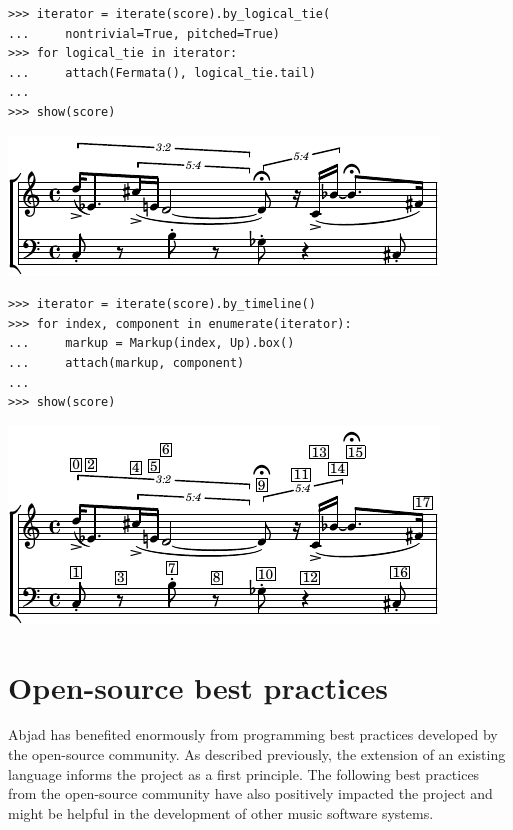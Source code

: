 \documentclass{article}
\begin{document}
\begin{lstlisting}
>>> iterator = iterate(score).by_logical_tie(
...     nontrivial=True, pitched=True)
>>> for logical_tie in iterator:
...     attach(Fermata(), logical_tie.tail)
...
>>> show(score)
\end{lstlisting}
\includegraphics{assets/lilypond-fff28391092702cdbeee1a1a28ff395d.pdf}

\begin{lstlisting}
>>> iterator = iterate(score).by_timeline()
>>> for index, component in enumerate(iterator):
...     markup = Markup(index, Up).box()
...     attach(markup, component)
...
>>> show(score)
\end{lstlisting}
\includegraphics{assets/lilypond-a0f0024aef8572171e2aa922cc739cb1.pdf}

\section{Open-source best practices} \label{sec:open-source}

Abjad has benefited enormously from programming best practices developed by the
open-source community. As described previously, the extension of an existing
language informs the project as a first principle. The following best practices
from the open-source community have also positively impacted the project and
might be helpful in the development of other music software systems.
\end{document}
